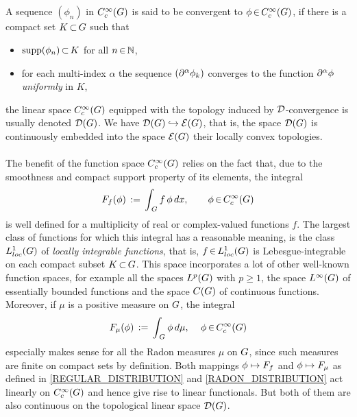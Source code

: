 \documentclass[11pt,twoside]{article}
\begin{document}
\subparagraph{}
A sequence $(\phi_n)$ in $C_c^{\infty}(G)$ is said to be convergent to $\phi {\,\in\,} C_c^{\infty}(G)$,
if there is a compact set $K {\,\subset\,} G$
such that

\begin{itemize}[leftmargin=22mm]
\item[(D-1)]
$\operatorname{supp}(\phi_n) {\,\subset\,} K$ for all $n {\,\in\,} {\mathbb{N}}$,

\item[(D-2)]
for each multi-index $\alpha$ the sequence $(\partial^{\alpha} \phi_k)$
converges to the function $\partial^{\alpha} \phi$ \textit{uniformly} in $K$,
\end{itemize}
the linear space $C_c^{\infty}(G)$ equipped with the topology
induced by ${\mathcal{D}}$-convergence is usually denoted ${\mathcal{D}}(G)$.
We have ${\mathcal{D}}(G) \hookrightarrow {\mathcal{E}}(G)$,
that is,
the space ${\mathcal{D}}(G)$ is continuously embedded into the space ${\mathcal{E}}(G)$
{\wrt} their locally convex topologies.

\paragraph{} %
The benefit of the function space $C_c^{\infty}(G)$ relies on the fact that,
due to the smoothness and compact support property of its elements,
the integral
\begin{equation}\label{REGULAR_DISTRIBUTION}
F_f(\phi) \,:=\, \int_{\,G} f \, \phi \, dx, \quad \quad \phi {\,\in\,} C_c^{\infty}(G)
\end{equation}
is well defined for a multiplicity of real or complex-valued functions $f$.
The largest class of functions
for which this integral has a reasonable meaning,
is the class $L_{loc}^1(G)$ of \textit{locally integrable functions},
that is,
$f {\,\in\,} L_{loc}^1(G)$ is Lebesgue-integrable on each compact subset $K {\,\subset\,} G$.
This space incorporates a lot of other well-known function spaces,
for example all the spaces $L^p(G)$ with $p \geq 1$,
the space $L^{\infty}(G)$ of essentially bounded functions
and the space $C(G)$ of continuous functions.
Moreover, 
if $\mu$ is a positive measure on $G$,
the integral
\begin{equation}\label{RADON_DISTRIBUTION}
F_{\mu}(\phi) \,:=\, \int_{\,G} \phi \, d\mu, \quad \, \phi {\,\in\,} C_c^{\infty}(G)
\end{equation}
especially makes sense for all the Radon measures $\mu$ on $G$,
since such measures are finite on compact sets by definition.
Both mappings $\phi \mapsto F_f$ and $\phi \mapsto F_{\mu}$
as defined in \eqref{REGULAR_DISTRIBUTION} and \eqref{RADON_DISTRIBUTION}
act linearly on $C_c^{\infty}(G)$ and hence give rise to linear functionals.
But both of them are also continuous on the topological linear space ${\mathcal{D}}(G)$.
\end{document}
